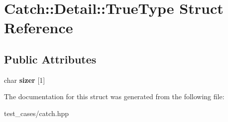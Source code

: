 \hypertarget{structCatch_1_1Detail_1_1TrueType}{}\section{Catch\+:\+:Detail\+:\+:True\+Type Struct Reference}
\label{structCatch_1_1Detail_1_1TrueType}
\subsection*{Public Attributes}
\begin{DoxyCompactItemize}
\item 
\mbox{\label{structCatch_1_1Detail_1_1TrueType_a3aaaeb75909e668b293c8a81f5fb6419}} 
char {\bfseries sizer} \mbox{[}1\mbox{]}
\end{DoxyCompactItemize}


The documentation for this struct was generated from the following file\+:\begin{DoxyCompactItemize}
\item 
test\+\_\+cases/catch.\+hpp\end{DoxyCompactItemize}
